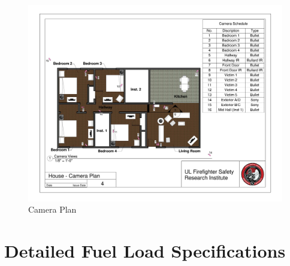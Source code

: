 \begin{figure}
\includegraphics[width=\textheight]{../0_Images/Appendix_Figures/Camera_Plan}
\caption[]{Camera Plan}
\label{fig:appendix_cameras}
\end{figure}

\clearpage \large
\chapter{Detailed Fuel Load Specifications} \label{App:Fuels}

